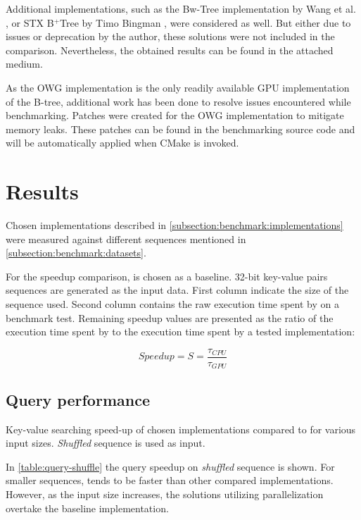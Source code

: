 Additional implementations, such as the Bw-Tree \cite{bw-tree} implementation by Wang et al. \cite{bwtree-impl}, or STX B$^+$Tree by Timo Bingman \cite{stx-b+tree}, were considered as well. But either due to issues or deprecation by the author, these solutions were not included in the comparison. Nevertheless, the obtained results can be found in the attached medium.

As the OWG implementation is the only readily available GPU implementation of the B-tree, additional work has been done to resolve issues encountered while benchmarking. Patches were created for the OWG implementation to mitigate memory leaks. These patches can be found in the benchmarking source code and will be automatically applied when CMake is invoked.

\section{Results}\label{section:results}

Chosen implementations described in \cref{subsection:benchmark:implementations} were measured against different sequences mentioned in \cref{subsection:benchmark:datasets}.

For the speedup comparison,  is chosen as a baseline. 32-bit key-value pairs sequences are generated as the input data. First column indicate the size of the sequence used. Second column contains the raw execution time spent by  on a benchmark test. Remaining speedup values are presented as the ratio of the execution time spent by  to the execution time spent by a tested implementation:

$$\mathit{Speedup} = S = \frac{\tau_{\mathit{CPU}}}{\tau_{\mathit{GPU}}}$$

\subsection{Query performance}
\begin{table}
  \centering
  
  \caption{Key-value searching speed-up of chosen implementations compared to  for various input sizes. \textit{Shuffled} sequence is used as input.}
  \label{table:query-shuffle}
\end{table}

In \cref{table:query-shuffle} the query speedup on \textit{shuffled} sequence is shown. For smaller sequences,  tends to be faster than other compared implementations. However, as the input size increases, the solutions utilizing parallelization overtake the baseline implementation.

